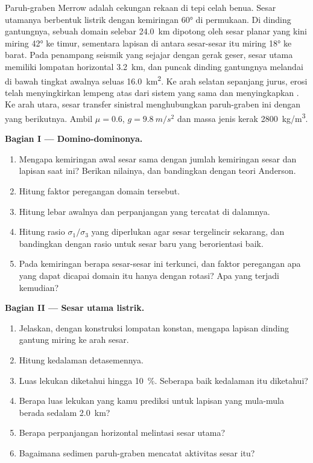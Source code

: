 \begin{problem}
\label{pb:b3:extension-strike-slip:1}
Paruh-graben Merrow adalah cekungan rekaan di tepi celah benua.
Sesar utamanya berbentuk listrik dengan kemiringan \ang{60} di permukaan. Di dinding gantungnya,
sebuah domain selebar \qty{24.0}{km} dipotong oleh sesar planar yang kini miring
\ang{42} ke timur, sementara lapisan di antara sesar-sesar itu miring \ang{18} ke barat. Pada penampang seismik
yang sejajar dengan gerak geser, sesar utama memiliki lompatan horizontal \qty{3.2}{km}, dan
puncak dinding gantungnya melandai di bawah tingkat awalnya seluas
\qty{16.0}{km^2}. Ke arah selatan sepanjang jurus, erosi telah menyingkirkan lempeng atas dari
sistem yang sama dan menyingkapkan . Ke arah utara, sesar transfer sinistral
menghubungkan paruh-graben ini dengan yang berikutnya. Ambil $\mu =
0.6$, $g = \qty{9.8}{m/s^2}$ dan massa jenis kerak
\qty{2800}{kg/m^3}.

\medskip\noindent\textbf{Bagian I --- Domino-dominonya.}
\begin{enumerate}
  \item Mengapa kemiringan awal sesar sama dengan jumlah kemiringan sesar dan lapisan saat ini?
        Berikan nilainya, dan bandingkan dengan teori Anderson.
  \item Hitung faktor peregangan domain tersebut.
  \item Hitung lebar awalnya dan perpanjangan yang tercatat di dalamnya.
  \item Hitung rasio $\sigma_1/\sigma_3$ yang diperlukan agar sesar tergelincir sekarang,
        dan bandingkan dengan rasio untuk sesar baru yang berorientasi baik.
  \item Pada kemiringan berapa sesar-sesar ini terkunci, dan faktor peregangan apa yang
        dapat dicapai domain itu hanya dengan rotasi? Apa yang terjadi kemudian?
\end{enumerate}

\medskip\noindent\textbf{Bagian II --- Sesar utama listrik.}
\begin{enumerate}[resume]
  \item Jelaskan, dengan konstruksi lompatan konstan, mengapa lapisan dinding gantung
        miring ke arah sesar.
  \item Hitung kedalaman detasemennya.
  \item Luas lekukan diketahui hingga \qty{10}{\percent}. Seberapa baik
        kedalaman itu diketahui?
  \item Berapa luas lekukan yang kamu prediksi untuk lapisan yang mula-mula
        berada sedalam \qty{2.0}{km}?
  \item Berapa perpanjangan horizontal melintasi sesar utama?
  \item Bagaimana sedimen paruh-graben mencatat aktivitas
        sesar itu?
\end{enumerate}


\end{problem}
